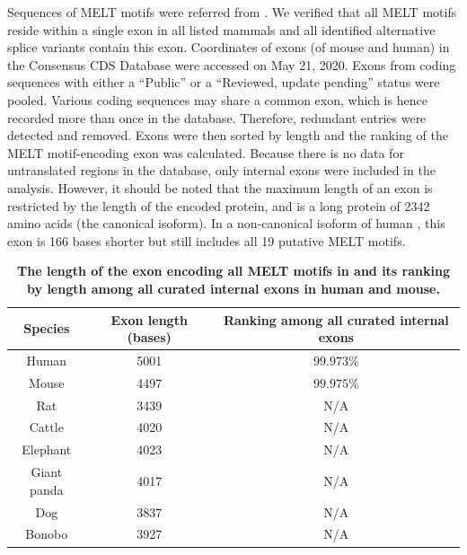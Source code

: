 \begin{table}[H]
    \renewcommand{\arraystretch}{1.5}
    \caption{\textbf{The length of the exon encoding all MELT motifs in  and its ranking by length among all curated internal exons in human and mouse.}}
    \noindent\justifying Sequences of MELT motifs were referred from \cite{MELTEvolution}. We verified that all MELT motifs reside within a single exon in all listed mammals and all identified alternative splice variants contain this exon. Coordinates of exons (of mouse and human) in the Consensus CDS Database were accessed on May 21, 2020. Exons from coding sequences with either a ``Public'' or a ``Reviewed, update pending'' status were pooled. Various coding sequences may share a common exon, which is hence recorded more than once in the database. Therefore, redundant entries were detected and removed. Exons were then sorted by length and the ranking of the MELT motif-encoding exon was calculated. Because there is no data for untranslated regions in the database, only internal exons were included in the analysis. However, it should be noted that the maximum length of an exon is restricted by the length of the encoded protein, and  is a long protein of \SI{2342}{} amino acids (the canonical isoform). In a non-canonical isoform of human , this exon is 166 bases shorter but still includes all 19 putative MELT motifs.
    \label{ExonLength}
    \begin{center}
        \begin{tabular}{c c c}
            \hline
            Species & Exon length (bases) & Ranking among all curated internal exons\\
            \hline
            Human & 5001 & $99.973\%$\\
            Mouse & 4497 & $99.975\%$\\
            Rat & 3439 & N/A\\
            Cattle & 4020 & N/A\\
            Elephant & 4023 & N/A\\ %
            Giant panda & 4017 & N/A\\
            Dog & 3837 & N/A\\
            Bonobo & 3927 & N/A\\
            \hline
        \end{tabular}
    \end{center}
\end{table}

